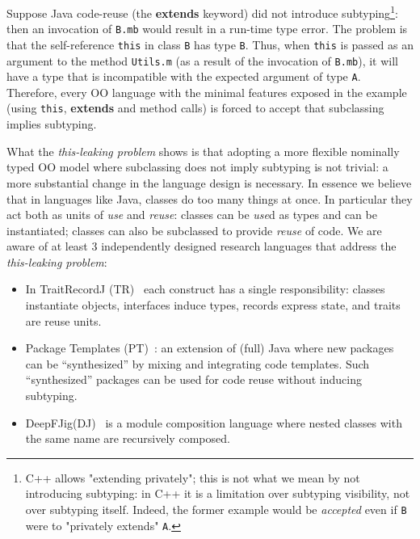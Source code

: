 Suppose Java code-reuse (the \textbf{extends} keyword) did not introduce subtyping\footnote{
C++ allows "extending privately"; this is not
what we mean by not introducing subtyping: in C++ it is a limitation over
  subtyping visibility, not over subtyping itself.  Indeed, the
  former example would be \emph{accepted} even if \lstinline{B} were to
  "privately extends" \lstinline{A}.}: then an invocation of 
\lstinline{B.mb} would result in a run-time type error.
The problem is that the
self-reference \lstinline{this} in class \lstinline{B} has 
type \lstinline{B}. Thus, when \lstinline{this} is passed as an argument to 
the method \lstinline{Utils.m} (as a result of the invocation of
\lstinline{B.mb}), it will have a type that is incompatible with the
expected argument of type \lstinline{A}.  
Therefore, every OO language with the minimal features exposed in the example (using \lstinline{this},
\textbf{extends} and method calls) is forced to accept that subclassing implies
subtyping.
  

What the \emph{this-leaking problem} shows is that adopting a more flexible
nominally typed OO model where subclassing does not imply subtyping is
not trivial: a more substantial change in the language design is
necessary.  In essence we believe that in languages like Java, classes do too many
things at once. In particular they act both as units of \emph{use} and
\emph{reuse}: classes can be \emph{use}d as types and can be instantiated;
classes can also be subclassed to provide \emph{reuse} of code.
We are aware of at least $3$ independently designed research
languages that address the \emph{this-leaking problem}:
\begin{itemize}
\item In TraitRecordJ (TR)~\cite{Bettini:2010:ISP:1774088.1774530,BETTINI2013521,Bettini2015282}
each construct has a single responsibility: classes instantiate objects,
interfaces induce types, records express state, and traits are reuse units.
\item Package Templates (PT)~\cite{KrogdahlMS09,DBLP:journals/taosd/AxelsenSKM12,DBLP:conf/gpce/AxelsenK12}:
an extension of (full) Java where new packages can be ``synthesized'' by mixing
and integrating code templates. 
Such ``synthesized'' packages can be used for code reuse without inducing subtyping.
\item DeepFJig(DJ)~\cite{deep,servetto2014meta,fjig} is
a module composition language where nested classes with the same name are recursively composed.
\end{itemize}

